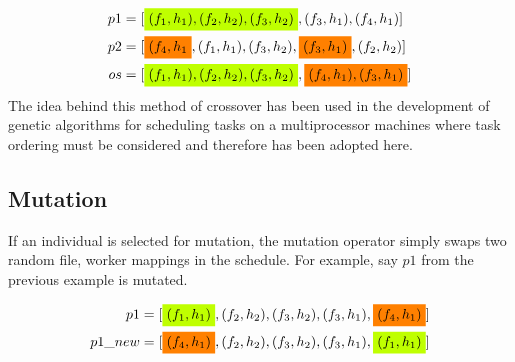 \begin{align}
 p1 & = [\mathcolorbox{lime}{(f_1, h_1), (f_2, h_2), (f_3, h_2)}, (f_3, h_1), (f_4, h_1)] \nonumber \\
 p2 & = [\mathcolorbox{orange}{(f_4, h_1}, (f_1, h_1),(f_3, h_2), \mathcolorbox{orange}{(f_3, h_1)}, (f_2, h_2)] \nonumber \\
 os & = [\mathcolorbox{lime}{(f_1, h_1), (f_2, h_2), (f_3, h_2)}, \mathcolorbox{orange}{(f_4, h_1), (f_3, h_1)}] \nonumber
\end{align}
The idea behind this method of crossover has been used in the development of
genetic algorithms for scheduling tasks on a multiprocessor machines \cite{wu-incremental-genetic-04}
where task ordering must be considered and therefore has been adopted here.

\subsection*{Mutation}
If an individual is selected for mutation, the mutation operator simply swaps
two random file, worker mappings in the schedule. For example, say $p1$ from
the previous example is mutated.

\begin{align}
 p1 & = [\mathcolorbox{lime}{(f_1, h_1)}, (f_2, h_2), (f_3, h_2), (f_3, h_1), \mathcolorbox{orange}{(f_4, h_1)}] \nonumber \\
 p1\_new & = [\mathcolorbox{orange}{(f_4, h_1)}, (f_2, h_2), (f_3, h_2), (f_3, h_1),\mathcolorbox{lime}{(f_1, h_1)}] \nonumber
\end{align}
